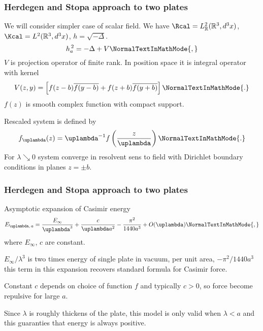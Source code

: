 \documentclass[10pt,t]{beamer}
\begin{document}
\begin{frame}
  \frametitle{Herdegen and Stopa approach to two plates
    \cite{HerdegenStopaGlobalVsLocal2010}}


  We will consider simpler case of scalar field. We have
  $\Rcal = L^{ 2 }_{ \Rbb }( \Rbb^{ 3 }, d^{ 3 }x )$,
  $\Kcal = L^{ 2 }( \Rbb^{ 3 }, d^{ 3 }x )$, $h = \sqrt{ -\Delta }$.
  \begin{equation}
    \label{eq:Herdegens-approach-21}
    h_{ a }^{ \, 2 } = -\Delta + V\NormalTextInMathMode{,}
  \end{equation}
  $V$ is projection operator of finite rank. In position space it is
  integral operator with kernel
  \begin{equation}
    \label{eq:Herdegens-approach-22}
    V( z, y ) =
    \left[ f( z - b ) \overline{ f( y - b ) } + f( z + b )
      \overline{ f( y + b ) } \right]\NormalTextInMathMode{.}
  \end{equation}
  $f( z )$ is smooth complex function with compact support.

  Rescaled system is defined by
  \begin{equation}
    \label{eq:Herdegens-approach-23}
    f_{ \lambda }( z ) =
    \lambda^{ -1 } f\left( \frac{ z }{ \lambda } \right)\NormalTextInMathMode{.}
  \end{equation}
  For $\lambda \searrow 0$ system converge in resolvent sens to field
  with Dirichlet boundary conditions in planes $z = \pm b$.

\end{frame}





\begin{frame}
  \frametitle{Herdegen and Stopa approach to two plates
    \cite{HerdegenStopaGlobalVsLocal2010}}


  Asymptotic expansion of Casimir energy
  \begin{equation}
    \label{eq:Herdegens-approach-24}
    E_{ \lambda,\, a } =
    \frac{ E_{ \infty } }{ \lambda^{ 3 } } + \frac{ c }{ \lambda a^{ 2 } }
    - \frac{ \pi^{ 2 } }{ 1440 a^{ 3 } } + O( \lambda )\NormalTextInMathMode{,}
  \end{equation}
  where $E_{ \infty }$, $c$ are constant.

  $E_{ \infty } / \lambda^{ 3 }$ is two times energy of single plate
  in vacuum, per unit area,
  $-\pi^{ 2 } / 1440 a^{ 3 }$ this term in this expansion recovers
  standard formula for Casimir force.

  Constant $c$ depends on choice of function $f$ and typically
  $c > 0$, so force become repulsive for large $a$.

  Since $\lambda$ is roughly thickens of the plate, this model is only
  valid when $\lambda < a$ and this guaranties that energy is always
  positive.

\end{frame}
\end{document}
